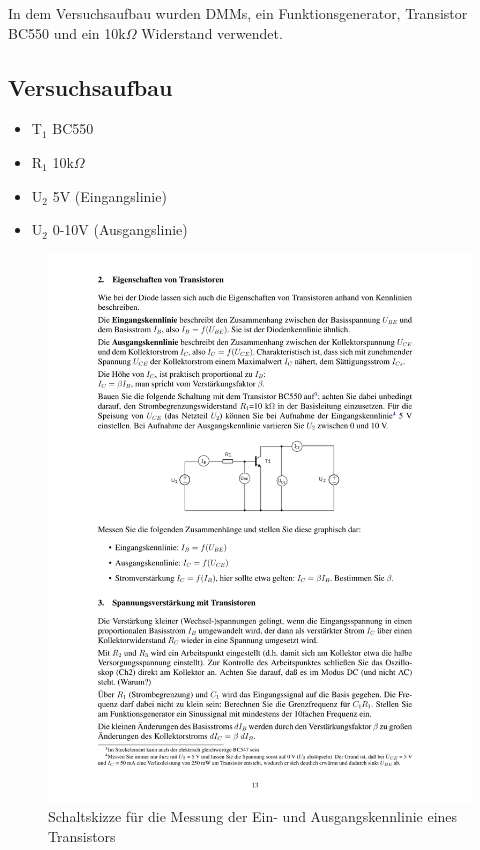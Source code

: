 \documentclass[12pt,a4paper]{article}
\begin{document}
In dem Versuchsaufbau wurden DMMs, ein Funktionsgenerator, Transistor BC550 und ein 10k$\Omega$ Widerstand verwendet.

\subsection{Versuchsaufbau}

\begin{itemize}
\item	T$_1$ BC550

\item	R$_1$ 10k$\Omega$

\item	U$_2$ 5V (Eingangslinie)

\item	U$_2$ 0-10V (Ausgangslinie)
\end{itemize}

\begin{figure}[H] 
  \centering
    \includegraphics[trim = 10mm 145mm 10mm 90mm, clip, scale = 1]{ep3_14[Page13].pdf}
  	\caption[Schaltskizze für die Messung der Ein- und Ausgangskennlinie eines Transistors]{Schaltskizze für die Messung der Ein- und Ausgangskennlinie eines Transistors\footnotemark}
  \label{fig:1}
\end{figure}
\end{document}
